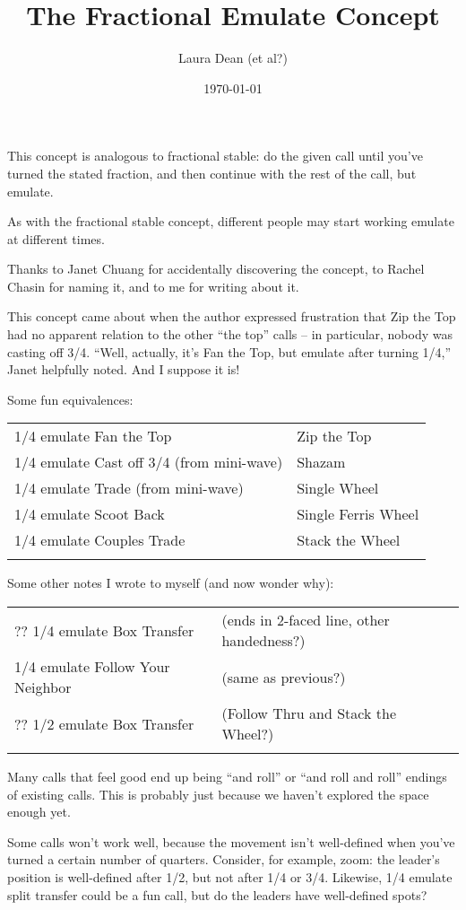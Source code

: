 \documentclass[11pt]{article}
\title{The Fractional Emulate Concept}
\author{Laura Dean (et al?)}
\date{\today}
\begin{document}
\thispagestyle{empty}
\maketitle


This concept is analogous to fractional stable:
do the given call until you've turned the stated fraction,
and then continue with the rest of the call, but emulate.

As with the fractional stable concept, different people may start
working emulate at different times.

Thanks to Janet Chuang for accidentally discovering the concept,
to Rachel Chasin for naming it, and to me for writing about it.

This concept came about when the author expressed frustration that Zip
the Top had no apparent relation to the other ``the top'' calls -- in
particular, nobody was casting off 3/4. 
``Well, actually, it's Fan the Top, but emulate after turning 1/4,''
Janet helpfully noted.  And I suppose it is!

Some fun equivalences:

\begin{tabular}{ll}
\hline
1/4 emulate Fan the Top   & Zip the Top \\
1/4 emulate Cast off 3/4 (from mini-wave)  & Shazam \\
1/4 emulate Trade (from mini-wave)   & Single Wheel \\
1/4 emulate Scoot Back  & Single Ferris Wheel \\
1/4 emulate Couples Trade  & Stack the Wheel \\
\hline \\
\end{tabular}

Some other notes I wrote to myself (and now wonder why):

\begin{tabular}{ll}
\hline
?? 1/4 emulate Box Transfer  & (ends in 2-faced line, other handedness?) \\
1/4 emulate Follow Your Neighbor  & (same as previous?) \\
?? 1/2 emulate Box Transfer  & (Follow Thru and Stack the Wheel?) \\
\hline \\
\end{tabular}


Many calls that feel good end up being ``and roll'' or ``and roll and
roll'' endings of existing calls.  This is probably just because we
haven't explored the space enough yet.

Some calls won't work well, because the movement isn't well-defined
when you've turned a certain number of quarters.  Consider, for
example, zoom: the leader's position is well-defined after 1/2, but
not after 1/4 or 3/4.  Likewise, 1/4 emulate split transfer could be a
fun call, but do the leaders have well-defined spots?
\end{document}
